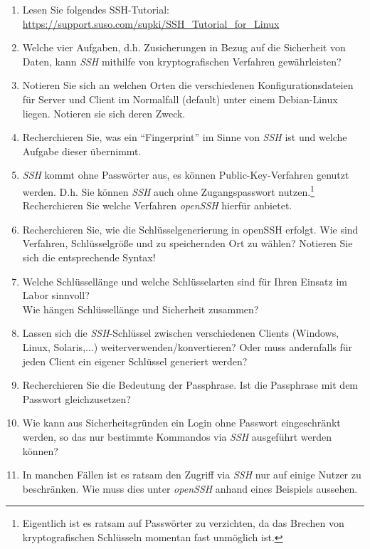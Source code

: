 \documentclass[paper=a4,fontsize=11pt]{scrartcl}%
\numberwithin{equation}{section}
\begin{document}
	\begin{enumerate}
		\item Lesen Sie folgendes SSH-Tutorial: \url{https://support.suso.com/supki/SSH_Tutorial_for_Linux}
		\item Welche vier Aufgaben, d.h. Zusicherungen in Bezug auf die Sicherheit von Daten, kann \emph{SSH} mithilfe von kryptografischen Verfahren gewährleisten?	
		\item Notieren Sie sich an welchen Orten die verschiedenen Konfigurationsdateien für Server und Client im Normalfall (default) unter einem Debian-Linux liegen. Notieren sie sich deren Zweck.
		\item Recherchieren Sie, was ein \enquote{Fingerprint} im Sinne von \emph{SSH} ist und welche Aufgabe dieser übernimmt. 
		\item \emph{SSH} kommt ohne Passwörter aus, es können Public-Key-Verfahren genutzt werden. D.h. Sie können \emph{SSH} auch ohne Zugangspasswort nutzen.\footnote{Eigentlich ist es ratsam auf Passwörter zu verzichten, da das Brechen von kryptografischen Schlüsseln momentan fast unmöglich ist.}\\
		Recherchieren Sie welche Verfahren \emph{openSSH} hierfür anbietet.
		\item Recherchieren Sie, wie die Schlüsselgenerierung in openSSH erfolgt. Wie sind Verfahren, Schlüsselgröße und zu speichernden Ort zu wählen? Notieren Sie sich die entsprechende Syntax!
		\item Welche Schlüssellänge und welche Schlüsselarten sind für Ihren Einsatz im Labor sinnvoll?\\
		Wie hängen Schlüssellänge und Sicherheit zusammen?
		\item Lassen sich die \emph{SSH}-Schlüssel zwischen verschiedenen Clients (Windows, Linux, Solaris,...) weiterverwenden/konvertieren? Oder muss andernfalls für jeden Client ein eigener Schlüssel generiert werden?
		\item Recherchieren Sie die Bedeutung der Passphrase. Ist die Passphrase mit dem Passwort gleichzusetzen?
		\item Wie kann aus Sicherheitsgründen ein Login ohne Passwort eingeschränkt werden, so das nur bestimmte Kommandos via \emph{SSH} ausgeführt werden können?
		\item In manchen Fällen ist es ratsam den Zugriff via \emph{SSH} nur auf einige Nutzer zu beschränken. Wie muss dies unter \emph{openSSH} anhand eines Beispiels aussehen.
	\end{enumerate}
	
\end{document}
